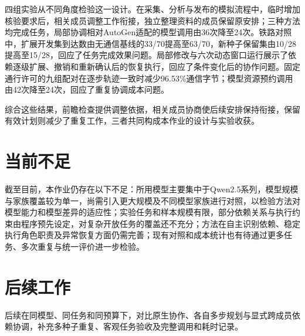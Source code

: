 四组实验从不同角度检验这一设计。在采集、分析与发布的模拟流程中，临时增加核验要求后，相关成员调整工作衔接，独立整理资料的成员保留原安排；三种方法均完成任务，局部协调相对AutoGen适配的模型调用由36次降至24次。铁路对照中，扩展开发集到达数由无通信基线的33/70提高至63/70，新种子保留集由10/28提高至15/28，回应了任务完成效果问题。局部修改与六次动态窗口运行展示了依赖逐级扩展、撤销和重新确认后的恢复执行，回应了条件变化后的协作问题。固定通行许可的九组配对在逐步轨迹一致时减少96.53\%通信字节；模型资源预约调用由42次降至24次，回应了重复协调成本问题。

综合这些结果，前瞻检查提供调整依据，相关成员协商使后续安排保持衔接，保留有效计划则减少了重复工作，三者共同构成本作业的设计与实验收获。

\section{当前不足}

截至目前，本作业仍存在以下不足：所用模型主要集中于Qwen2.5系列，模型规模与家族覆盖较为单一，尚需引入更大规模及不同模型家族进行对照，以检验方法对模型能力和模型差异的适应性；实验任务和样本规模有限，部分依赖关系与执行约束由程序预先设定，对复杂开放任务的覆盖还不充分；方法在自主识别依赖、稳定执行角色职责及异常恢复方面仍需完善；现有对照和成本统计也有待通过更多任务、多次重复与统一评价进一步检验。

\section{后续工作}

后续在同模型、同任务和同预算下，对比原生协作、各自多步规划与显式跨成员依赖协调，补充多种子重复、客观任务验收及完整调用和耗时记录。
